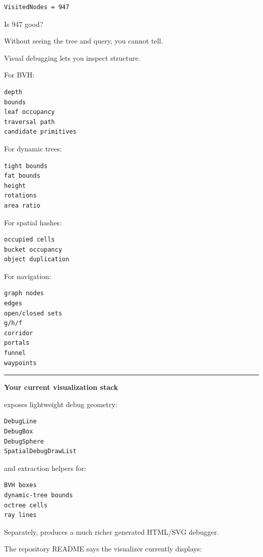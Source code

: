 \begin{verbatim}
VisitedNodes = 947
\end{verbatim}

Is 947 good?

Without seeing the tree and query, you cannot tell.

Visual debugging lets you inspect structure.

For BVH:

\begin{verbatim}
depth
bounds
leaf occupancy
traversal path
candidate primitives
\end{verbatim}

For dynamic trees:

\begin{verbatim}
tight bounds
fat bounds
height
rotations
area ratio
\end{verbatim}

For spatial hashes:

\begin{verbatim}
occupied cells
bucket occupancy
object duplication
\end{verbatim}

For navigation:

\begin{verbatim}
graph nodes
edges
open/closed sets
g/h/f
corridor
portals
funnel
waypoints
\end{verbatim}

\begin{center}\rule{0.5\linewidth}{0.5pt}\end{center}

\textbf{Your current visualization stack}

 exposes lightweight debug geometry:

\begin{verbatim}
DebugLine
DebugBox
DebugSphere
SpatialDebugDrawList
\end{verbatim}

and extraction helpers for:

\begin{verbatim}
BVH boxes
dynamic-tree bounds
octree cells
ray lines
\end{verbatim}

Separately,  produces a much richer generated HTML/SVG debugger.

The repository README says the visualizer currently displays:

